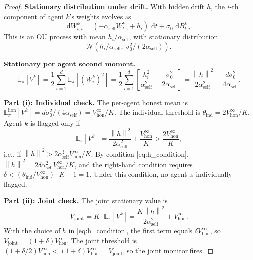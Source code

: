 \documentclass[12pt]{article}
\theoremstyle{plain}
\theoremstyle{definition}
\newcommand{\E}{\mathbb{E}}
\newcommand{\norm}[1]{\left\lVert #1 \right\rVert}
\newcommand{\dif}{\,\mathrm{d}}
\begin{document}
\begin{proof}
  \textbf{Stationary distribution under drift.}
  With hidden drift $h$, the $i$-th component of agent $k$'s weights
  evolves as
  \[
    \dif W^k_{t,i} = (-\alpha_{\mathrm{self}} W^k_{t,i} + h_i)\,\dif t
    + \sigma_0\,\dif B^k_{t,i}.
  \]
  This is an OU process with mean $h_i/\alpha_{\mathrm{self}}$, with
  stationary distribution
  \[
    \mathcal{N}\!\left(h_i/\alpha_{\mathrm{self}},\; \sigma_0^2/(2\alpha_{\mathrm{self}})\right).
  \]

  \textbf{Stationary per-agent second moment.}
  \[
    \E_\pi[V^k] = \frac{1}{2}\sum_{i=1}^d \E_\pi[(W^k_i)^2]
    = \frac{1}{2}\sum_{i=1}^d \left[\frac{h_i^2}{\alpha_{\mathrm{self}}^2}
    + \frac{\sigma_0^2}{2\alpha_{\mathrm{self}}}\right]
    = \frac{\norm{h}^2}{2\alpha_{\mathrm{self}}^2}
    + \frac{d\sigma_0^2}{4\alpha_{\mathrm{self}}}.
  \]

  \textbf{Part (i): Individual check.}
  The per-agent honest mean is
  $\E_\pi^{\mathrm{hon}}[V^k] = d\sigma_0^2/(4\alpha_{\mathrm{self}})
  = V^\infty_{\mathrm{hon}}/K$.
  The individual threshold is $\theta_{\mathrm{ind}} = 2V^\infty_{\mathrm{hon}}/K$.
  Agent $k$ is flagged only if
  \[
    \E_\pi[V^k] = \frac{\norm{h}^2}{2\alpha_{\mathrm{self}}^2}
    + \frac{V^\infty_{\mathrm{hon}}}{K}
    > \frac{2V^\infty_{\mathrm{hon}}}{K},
  \]
  i.e., if $\norm{h}^2 > 2\alpha_{\mathrm{self}}^2 V^\infty_{\mathrm{hon}} / K$.
  By condition \eqref{eq:h_condition},
  $\norm{h}^2 = 2\delta\alpha_{\mathrm{self}}^2 V^\infty_{\mathrm{hon}} / K$,
  and the right-hand condition requires
  $\delta < (\theta_{\mathrm{ind}}/V^\infty_{\mathrm{hon}})\cdot K - 1
  = 1$.  Under this condition, no agent is individually flagged.

  \textbf{Part (ii): Joint check.}
  The joint stationary value is
  \[
    V_{\mathrm{joint}} = K \cdot \E_\pi[V^k]
    = \frac{K\norm{h}^2}{2\alpha_{\mathrm{self}}^2}
    + V^\infty_{\mathrm{hon}}.
  \]
  With the choice of $h$ in \eqref{eq:h_condition},
  the first term equals $\delta V^\infty_{\mathrm{hon}}$, so
  $V_{\mathrm{joint}} = (1 + \delta) V^\infty_{\mathrm{hon}}$.
  The joint threshold is $(1+\delta/2) V^\infty_{\mathrm{hon}} <
  (1+\delta) V^\infty_{\mathrm{hon}} = V_{\mathrm{joint}}$, so the
  joint monitor fires.
\end{proof}
\end{document}
